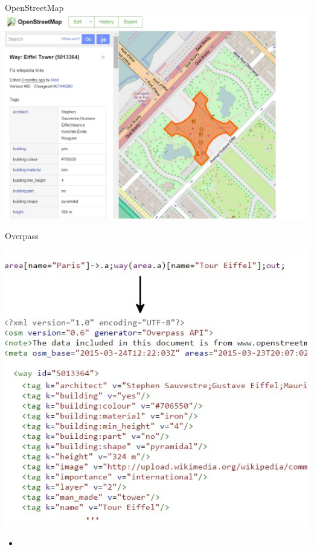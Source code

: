 \documentclass[note=hide]{beamer} %
\begin{document}
\begin{frame}{OpenStreetMap}
	\includegraphics[width=\textwidth]{openstreetmap.jpg}
\end{frame}

\begin{frame}{Overpass}
	\begin{minipage}{0.64\textwidth}
		\flushleft
		\includegraphics[width=\textwidth]{overpass.jpg}
	\end{minipage}
	\hfill
	\begin{minipage}{0.34\textwidth}
		\flushright
		\begin{itemize}
			\item 
		\end{itemize}
	\end{minipage}
\end{frame}
\end{document}
